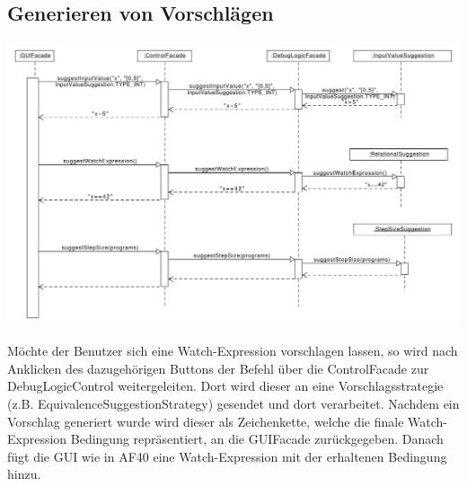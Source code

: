 \documentclass[parskip=full]{scrartcl}
\begin{document}
\subsection{Generieren von Vorschlägen}%
\begin{center}
\includegraphics[width=1.0\textwidth]{diagrammIdeenUmlet/SequenceDiagrams/seq_suggestions.pdf}
\end{center}
Möchte der Benutzer sich eine Watch-Expression vorschlagen lassen, so wird nach Anklicken des dazugehörigen Buttons der Befehl über die ControlFacade zur DebugLogicControl weitergeleiten. Dort wird dieser an eine Vorschlagsstrategie (z.B. EquivalenceSuggestionStrategy) gesendet und dort verarbeitet. Nachdem ein Vorschlag generiert wurde wird dieser als Zeichenkette, welche die finale Watch-Expression Bedingung repräsentiert, an die GUIFacade zurückgegeben. Danach fügt die GUI wie in AF40 eine Watch-Expression mit der erhaltenen Bedingung hinzu.

\newpage
\end{document}

